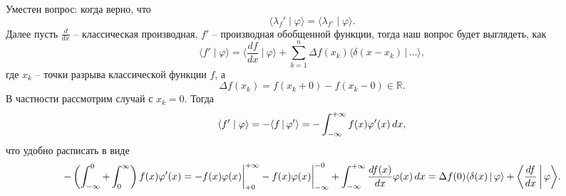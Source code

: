Уместен вопрос: когда верно, что
\begin{equation*}
    \langle \lambda_f' \mid \varphi\rangle = \langle  \lambda_{f'} \mid \varphi\rangle.
\end{equation*}
Далее пусть $\frac{d }{d x}$ -- классическая производная, $f'$ -- производная обобщенной функции, тогда наш вопрос будет выглядеть, как
\begin{equation*}
    \langle f' \mid \varphi \rangle = \bigg\langle 
        \frac{d f}{d x} \ \bigg|\ \varphi
    \bigg\rangle + \sum_{k=1}^{n} \Delta f(x_k) \langle \delta(x-x_k) \,|\, \ldots \rangle ,
\end{equation*}
где $x_k$ -- точки разрыва классической функции $f$, а
\begin{equation*}
    \Delta f (x_k) = f(x_k + 0) - f(x_k - 0) \in \mathbb{R}.
\end{equation*}
В частности рассмотрим  случай с $x_k = 0$. Тогда
\begin{equation*}
    \langle f' \mid \varphi \rangle = - \langle f \,|\, \varphi' \rangle = - \int_{-\infty}^{+\infty} f(x) \varphi'(x) \, d x,
\end{equation*}
что удобно расписать в виде
\begin{equation*}
    - \left(\int_{- \infty}^{0} + \int_0^\infty\right) f(x) \varphi'(x) = 
    - f(x) \varphi(x) \bigg|_{+0}^{+\infty} - f(x) \varphi(x) \bigg|_{-\infty}^{-0} + 
    \int_{-\infty}^{+\infty} \frac{d f(x)}{d x} \varphi(x) \, d x =  \Delta f(0) \langle \delta(x) \,|\, \varphi \rangle + \bigg\langle \frac{d f}{d x}  \,\bigg|\, \varphi  \bigg\rangle.
\end{equation*}



